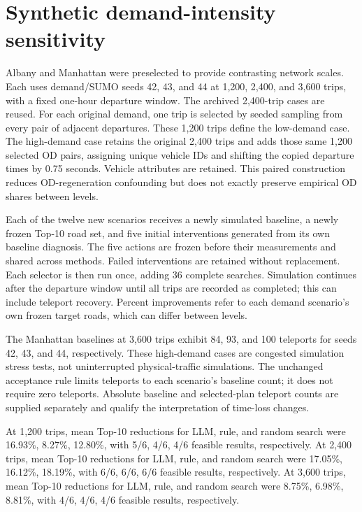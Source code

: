 \documentclass[11pt]{article}
\begin{document}
\section{Synthetic demand-intensity sensitivity}
Albany and Manhattan were preselected to provide contrasting network scales. Each uses demand/SUMO seeds 42, 43, and 44 at 1,200, 2,400, and 3,600 trips, with a fixed one-hour departure window. The archived 2,400-trip cases are reused. For each original demand, one trip is selected by seeded sampling from every pair of adjacent departures. These 1,200 trips define the low-demand case. The high-demand case retains the original 2,400 trips and adds those same 1,200 selected OD pairs, assigning unique vehicle IDs and shifting the copied departure times by 0.75 seconds. Vehicle attributes are retained. This paired construction reduces OD-regeneration confounding but does not exactly preserve empirical OD shares between levels.

Each of the twelve new scenarios receives a newly simulated baseline, a newly frozen Top-10 road set, and five initial interventions generated from its own baseline diagnosis. The five actions are frozen before their measurements and shared across methods. Failed interventions are retained without replacement. Each selector is then run once, adding 36 complete searches. Simulation continues after the departure window until all trips are recorded as completed; this can include teleport recovery. Percent improvements refer to each demand scenario's own frozen target roads, which can differ between levels.

The Manhattan baselines at 3,600 trips exhibit 84, 93, and 100 teleports for seeds 42, 43, and 44, respectively. These high-demand cases are congested simulation stress tests, not uninterrupted physical-traffic simulations. The unchanged acceptance rule limits teleports to each scenario's baseline count; it does not require zero teleports. Absolute baseline and selected-plan teleport counts are supplied separately and qualify the interpretation of time-loss changes.

\begin{table}[htbp]\centering\small

\caption{Demand sensitivity across six city--seed cases per level. SD describes variation across those cases, rather than repeated LLM sampling. The 2,400-trip rows reuse the corresponding primary results.}
\end{table}

At 1,200 trips, mean Top-10 reductions for LLM, rule, and random search were 16.93\%, 8.27\%, 12.80\%, with 5/6, 4/6, 4/6 feasible results, respectively. At 2,400 trips, mean Top-10 reductions for LLM, rule, and random search were 17.05\%, 16.12\%, 18.19\%, with 6/6, 6/6, 6/6 feasible results, respectively. At 3,600 trips, mean Top-10 reductions for LLM, rule, and random search were 8.75\%, 6.98\%, 8.81\%, with 4/6, 4/6, 4/6 feasible results, respectively.
\end{document}
